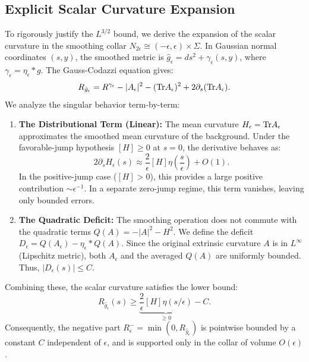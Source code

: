 \subsection{Explicit Scalar Curvature Expansion}
To rigorously justify the $L^{3/2}$ bound, we derive the expansion of the scalar curvature in the smoothing collar $N_{2\epsilon} \cong (-\epsilon, \epsilon) \times \Sigma$. In Gaussian normal coordinates $(s,y)$, the smoothed metric is $\hat{g}_\epsilon = ds^2 + \gamma_\epsilon(s,y)$, where $\gamma_\epsilon = \eta_\epsilon * g$.
The Gauss-Codazzi equation gives:
\begin{equation}
    R_{\hat{g}_\epsilon} = R^{\gamma_\epsilon} - |A_\epsilon|^2 - (\mathrm{Tr} A_\epsilon)^2 + 2 \partial_s (\mathrm{Tr} A_\epsilon).
\end{equation}
We analyze the singular behavior term-by-term:
\begin{enumerate}
    \item \textbf{The Distributional Term (Linear):} The mean curvature $H_\epsilon = \mathrm{Tr} A_\epsilon$ approximates the smoothed mean curvature of the background. Under the favorable-jump hypothesis $[H] \ge 0$ at $s=0$, the derivative behaves as:
    \[ 2\partial_s H_\epsilon(s) \approx \frac{2}{\epsilon}[H] \eta\left(\frac{s}{\epsilon}\right) + O(1). \]
    In the positive-jump case ($[H]>0$), this provides a large positive contribution $\sim \epsilon^{-1}$. In a separate zero-jump regime, this term vanishes, leaving only bounded errors.
    \item \textbf{The Quadratic Deficit:} The smoothing operation does not commute with the quadratic terms $Q(A) = -|A|^2 - H^2$. We define the deficit $D_\epsilon = Q(A_\epsilon) - \eta_\epsilon * Q(A)$.
    Since the original extrinsic curvature $A$ is in $L^\infty$ (Lipschitz metric), both $A_\epsilon$ and the averaged $Q(A)$ are uniformly bounded. Thus, $|D_\epsilon(s)| \le C$.
\end{enumerate}
Combining these, the scalar curvature satisfies the lower bound:
\[ R_{\hat{g}_\epsilon}(s) \ge \underbrace{\frac{2}{\epsilon}[H]\eta(s/\epsilon)}_{\ge 0} - C. \]
Consequently, the negative part $R^-_\epsilon = \min(0, R_{\hat{g}_\epsilon})$ is pointwise bounded by a constant $C$ independent of $\epsilon$, and is supported only in the collar of volume $O(\epsilon)$.

